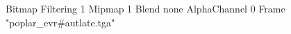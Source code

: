 {Bitmap
	{Filtering 1}
	{Mipmap 1}
	{Blend none}
	{AlphaChannel 0}
	{Frame "poplar_evr#autlate.tga"}
}
